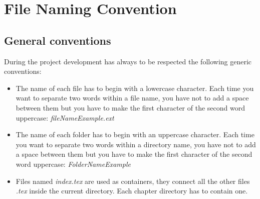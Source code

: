 \documentclass[12pt]{article}
\begin{document}
\section{File Naming Convention}

\subsection{General conventions}
During the project development has always to be respected the following generic conventions:
\begin{itemize}
  \item The name of each file has to begin with a lowercase character. Each time you want to separate two words within a file name, you have not to add a space between them but you have to make the first character of the second word uppercase: \textit{fileNameExample.ext}
  \item The name of each folder has to begin with an uppercase character. Each time you want to separate two words within a directory name, you have not to add a space between them but you have to make the first character of the second word uppercase: \textit{FolderNameExample}
   \item Files named \textit{index.tex} are used as containers, they connect all the other files \textit{.tex} inside the current directory. Each chapter directory has to contain one.
\end{itemize}
\end{document}
